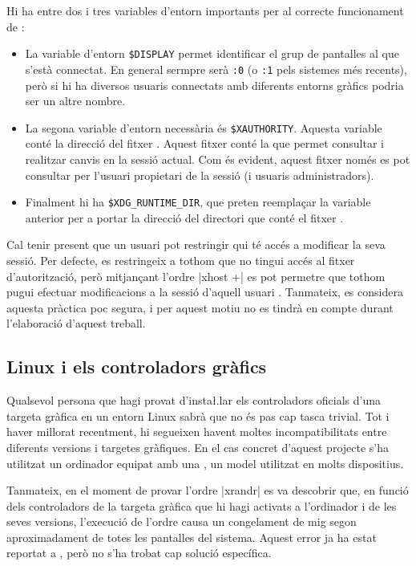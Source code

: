 Hi ha entre dos i tres variables d'entorn importants per al correcte funcionament
de  \cite{XrandrVars}:

\begin{itemize}
    \item La variable d'entorn \verb|$DISPLAY| permet identificar el grup de
    pantalles al que s'està connectat. En general sermpre serà \verb|:0| (o 
    \verb|:1| pels sistemes més recents), però si hi ha diversos usuaris
    connectats amb diferents entorns gràfics podria ser un altre nombre.
    \item La segona variable d'entorn necessària és \verb|$XAUTHORITY|. Aquesta
    variable conté la direcció del fitxer . Aquest fitxer
    conté la  que permet consultar i realitzar canvis en la sessió
    actual. Com és evident, aquest fitxer només es pot consultar per l'usuari
    propietari de la sessió (i usuaris administradors).
    \item Finalment hi ha \verb|$XDG_RUNTIME_DIR|, que preten reemplaçar la
    variable anterior per a portar la direcció del directori que conté el fitxer
    .
\end{itemize}

Cal tenir present que un usuari pot restringir qui té accés a modificar la
seva sessió. Per defecte, es restringeix a tothom que no tingui accés al
fitxer d'autorització, però mitjançant l'ordre \ord|xhost +| es pot permetre
que tothom pugui efectuar modificacions a la sessió d'aquell usuari \cite{Xhost}.
Tanmateix, es considera aquesta pràctica poc segura, i per aquest motiu no es
tindrà en compte durant l'elaboració d'aquest treball.

\subsection{Linux i els controladors gràfics}

Qualsevol persona que hagi provat d'insta\l.lar els controladors oficials
d'una targeta gràfica en un entorn Linux sabrà que no és pas cap tasca trivial.
Tot i haver millorat recentment, hi segueixen havent moltes incompatibilitats
entre diferents versions i targetes gràfiques. En el cas concret d'aquest
projecte s'ha utilitzat un ordinador equipat amb una ,
un model utilitzat en molts dispositius.

Tanmateix, en el moment de provar l'ordre \ord|xrandr| es va descobrir que,
en funció dels controladors de la targeta gràfica que hi hagi activats a
l'ordinador i de les seves versions, l'execució de l'ordre causa un congelament
de mig segon aproximadament de totes les pantalles del sistema. Aquest error ja
ha estat reportat a \cite{xrandrBug}, però no s'ha trobat cap solució
específica.


